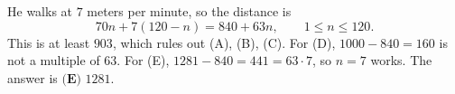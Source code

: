 He walks at $7$ meters per minute, so the distance is
\[70n+7(120-n)=840+63n,\qquad 1\le n\le 120.\]
This is at least $903$, which rules out (A), (B), (C). For (D), $1000-840=160$ is not a multiple of $63$. For (E), $1281-840=441=63\cdot7$, so $n=7$ works. The answer is $\boxed{\textbf{(E) } 1281}$.
